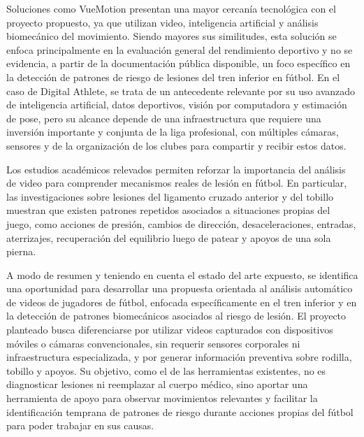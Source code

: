 Soluciones como VueMotion presentan una mayor cercanía tecnológica con el proyecto
propuesto, ya que utilizan video, inteligencia artificial y análisis biomecánico del
movimiento. Siendo mayores sus similitudes, esta solución se enfoca principalmente en la
evaluación general del rendimiento deportivo y no se evidencia, a partir de la documentación
pública disponible, un foco específico en la detección de patrones de riesgo de lesiones del
tren inferior en fútbol. En el caso de Digital Athlete, se trata de un antecedente relevante
por su uso avanzado de inteligencia artificial, datos deportivos, visión por computadora y
estimación de pose, pero su alcance depende de una infraestructura que requiere una
inversión importante y conjunta de la liga profesional, con múltiples cámaras, sensores y
de la organización de los clubes para compartir y recibir estos datos.

Los estudios académicos relevados permiten reforzar la importancia del análisis de video
para comprender mecanismos reales de lesión en fútbol. En particular, las investigaciones
sobre lesiones del ligamento cruzado anterior y del tobillo muestran que existen patrones
repetidos asociados a situaciones propias del juego, como acciones de presión, cambios de
dirección, desaceleraciones, entradas, aterrizajes, recuperación del equilibrio luego de
patear y apoyos de una sola pierna.

A modo de resumen y teniendo en cuenta el estado del arte expuesto, se identifica una
oportunidad para desarrollar una propuesta orientada al análisis automático de videos de
jugadores de fútbol, enfocada específicamente en el tren inferior y en la detección de
patrones biomecánicos asociados al riesgo de lesión. El proyecto planteado busca
diferenciarse por utilizar videos capturados con dispositivos móviles o cámaras
convencionales, sin requerir sensores corporales ni infraestructura especializada, y por
generar información preventiva sobre rodilla, tobillo y apoyos. Su objetivo, como el de las
herramientas existentes, no es diagnosticar lesiones ni reemplazar al cuerpo médico, sino
aportar una herramienta de apoyo para observar movimientos relevantes y facilitar la
identificación temprana de patrones de riesgo durante acciones propias del fútbol para
poder trabajar en sus causas.

